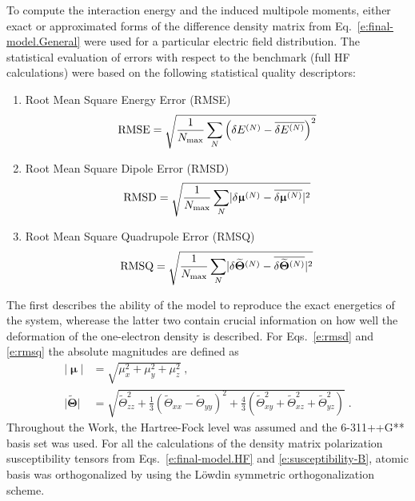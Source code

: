 \documentclass[aip,amsmath,amssymb,reprint,floatfix]{revtex4-1}
\newcommand{\BM}[1]{\bm{#1}}
\begin{document}
To compute the interaction energy and the induced multipole moments, either exact or approximated forms
of the difference density matrix from Eq.~\eqref{e:final-model.General}
were used for a particular electric field distribution. The statistical evaluation of
errors with respect to the benchmark (full HF calculations) were based on 
the following statistical quality descriptors:
%
\begin{enumerate}
 \item Root Mean Square Energy Error (RMSE)
   \begin{equation}\label{e:rmse}
     {\rm RMSE} = \sqrt{ \frac{1}{N_{\rm max}} \sum_N \left( \delta E^{(N)} - \overline{\delta E^{(N)}}\right)^2 }
   \end{equation}
 \item Root Mean Square Dipole Error (RMSD)
   \begin{equation}\label{e:rmsd}
     {\rm RMSD} = \sqrt{ \frac{1}{N_{\rm max}}\sum_N \lvert \delta {\BM\upmu}^{(N)} - \overline{\delta {\BM\upmu}^{(N)}}\rvert^2 }
   \end{equation}
 \item Root Mean Square Quadrupole Error (RMSQ)
   \begin{equation}\label{e:rmsq}
     {\rm RMSQ} = \sqrt{ \frac{1}{N_{\rm max}}\sum_N \lvert \delta \widetilde{\BM\Theta}^{(N)} - \overline{\delta \widetilde{\BM\Theta}^{(N)}}\rvert^2 }
   \end{equation}
\end{enumerate}
%
The first describes the ability of the model to reproduce the exact energetics of the system, 
wherease the latter two contain crucial information on how well the deformation of the one\hyp{}electron
density is described. For Eqs.~\eqref{e:rmsd} and \eqref{e:rmsq} the absolute magnitudes
are defined as
%
\begin{subequations}\label{e:absmagn}
  \begin{align}
   \lvert {\BM\upmu} \rvert &= \sqrt{\mu_x^2+\mu_y^2+\mu_z^2} \;,\\
   \lvert {\widetilde{\BM\Theta}}\rvert &= 
          \sqrt{\widetilde{\Theta}_{zz}^2 + \frac{1}{3}\left(\widetilde{\Theta}_{xx}-\widetilde{\Theta}_{yy}\right)^2 
          + \frac{4}{3}\left( \widetilde{\Theta}_{xy}^2 + \widetilde{\Theta}_{xz}^2 + \widetilde{\Theta}_{yz}^2 \right)} \;. 
  \end{align}
\end{subequations}
%
Throughout the Work, the Hartree\hyp{}Fock level\cite{Roothaan.RevModPhys.1951} was assumed 
and the 6-311++G** basis set\cite{Krishnan.Binkley.Seeger.Pople.JCP.1980}
was used. For all the calculations of the density matrix polarization susceptibility tensors
from Eqs.~\eqref{e:final-model.HF} and \eqref{e:susceptibility-B}, 
atomic basis was orthogonalized by using the L{\"o}wdin symmetric orthogonalization scheme.\cite{Mayer.IJQC.2002}
\end{document}
